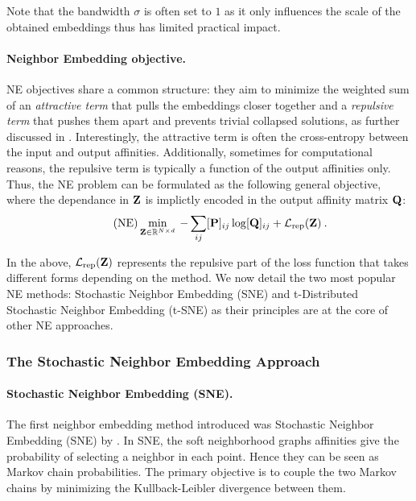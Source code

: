 \begin{remark}
    Note that the bandwidth $\sigma$ is often set to $1$ as it only influences the scale of the obtained embeddings thus has limited practical impact.
\end{remark}

\paragraph{Neighbor Embedding objective.}
NE objectives share a common structure: they aim to minimize the weighted sum of an \emph{attractive term} that pulls the embeddings closer together and a \emph{repulsive term} that pushes them apart and prevents trivial collapsed solutions, as further discussed in . Interestingly, the attractive term is often the cross-entropy between the input and output affinities. Additionally, sometimes for computational reasons, the repulsive term is typically a function of the output affinities only. Thus, the NE problem can be formulated as the following general objective, where the dependance in ${\mathbf{Z}}$ is implictly encoded in the output affinity matrix ${\mathbf{Q}}$:
\begin{align}\tag{NE}\label{eq:ne_attraction_repulsion}
    \min_{{\mathbf{Z}} \in \mathbb{R}^{N \times d}} \: - \sum_{ij} [{\mathbf{P}}]_{ij} \log [{\mathbf{Q}}]_{ij} + \mathcal{L}_{\mathrm{rep}}({\mathbf{Z}}) \:.
\end{align}

In the above, \(\mathcal{L}_{\mathrm{rep}}({\mathbf{Z}})\) represents the repulsive part of the loss function that takes different forms depending on the method. We now detail the two most popular NE methods: Stochastic Neighbor Embedding (SNE) and t-Distributed Stochastic Neighbor Embedding (t-SNE) as their principles are at the core of other NE approaches.

\subsubsection{The Stochastic Neighbor Embedding Approach}\label{sec:sne}

\paragraph{Stochastic Neighbor Embedding (SNE).}The first neighbor embedding method introduced was Stochastic Neighbor Embedding (SNE) by \cite{hinton2002stochastic}. In SNE, the soft neighborhood graphs affinities give the probability of selecting a neighbor in each point. Hence they can be seen as Markov chain probabilities. The primary objective is to couple the two Markov chains by minimizing the Kullback-Leibler divergence between them. 


